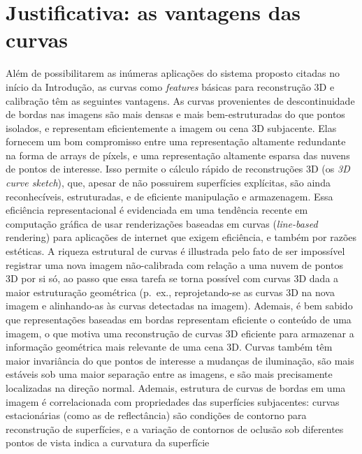 \documentclass[a4paper,titlepage]{article}
\newcommand{\eg}{{p.\ ex.}}
\begin{document}

\section{Justificativa: as vantagens das curvas}
Além de possibilitarem as inúmeras aplicações do sistema proposto citadas no início da
Introdução, as curvas como \emph{features} básicas para reconstrução 3D e
calibração têm as seguintes vantagens.  As curvas provenientes de
descontinuidade de bordas nas imagens são mais densas e mais bem-estruturadas do
que pontos isolados, e representam eficientemente a imagem ou cena 3D
subjacente. Elas fornecem um bom compromisso entre uma representação altamente
redundante na forma de arrays de píxels, e uma representação altamente esparsa
das nuvens de pontos de interesse. Isso permite o cálculo rápido de
reconstruções 3D (os \emph{3D curve sketch}), que, apesar de não possuirem
superfícies explícitas, são ainda reconhecíveis, estruturadas, e de eficiente
manipulação e armazenagem. Essa eficiência representacional é evidenciada em
uma tendência recente em computação gráfica de usar renderizações baseadas em
curvas (\emph{line-based} rendering) para aplicações de internet que exigem
eficiência, e também por razões estéticas. A riqueza estrutural de curvas é
illustrada pelo fato de ser impossível registrar uma nova imagem não-calibrada
com relação a uma nuvem de pontos 3D por si só, ao passo que essa tarefa se
torna possível com curvas 3D dada a maior estruturação geométrica (\eg,
reprojetando-se as curvas 3D na nova imagem e alinhando-as às curvas detectadas
na imagem). Ademais, é bem sabido que representações baseadas em bordas
representam eficiente o conteúdo de uma imagem, o que motiva uma reconstrução de
curvas 3D eficiente para armazenar a informação geométrica mais relevante de uma
cena 3D. Curvas também têm maior invariância do que pontos de interesse a
mudanças de iluminação, são mais estáveis sob uma maior separação entre as
imagens, e são mais precisamente localizadas na direção normal. Ademais,
estrutura de curvas de bordas em uma imagem é correlacionada com propriedades
das superfícies subjacentes: curvas estacionárias (como as de reflectância) são
condições de contorno para reconstrução de superfícies, e a variação de
contornos de oclusão sob diferentes pontos de vista indica a curvatura da
superfície
\end{document}
